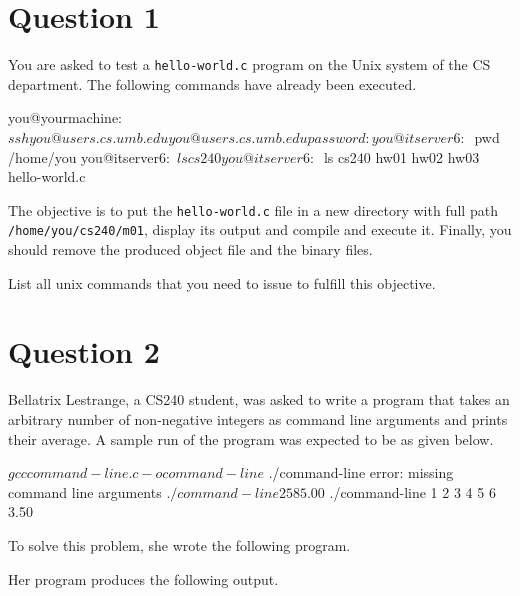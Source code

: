 \documentclass[12pt,letterpaper,twoside]{article}
\begin{document}


\section*{Question 1}

You are asked to test a \texttt{hello-world.c} program on the Unix system of the CS department.
The following commands have already been executed.

\begin{terminal}
you@yourmachine:~$ ssh you@users.cs.umb.edu
you@users.cs.umb.edu password:
you@itserver6:~$ pwd
/home/you
you@itserver6:~$ ls
cs240
you@itserver6:~$ ls cs240
hw01 hw02 hw03 hello-world.c
\end{terminal}

The objective is to put the \texttt{hello-world.c} file in a new directory with full path \texttt{/home/you/cs240/m01}, display its output and compile and execute it.
Finally, you should remove the produced object file and the binary files.

List all unix commands that you need to issue to fulfill this objective.

\newpage

\section*{Question 2}

Bellatrix Lestrange, a CS240 student, was asked to write a program that takes an arbitrary number of non-negative integers as command line arguments and prints their average.
A sample run of the program was expected to be as given below.

\begin{terminal}
$ gcc command-line.c -o command-line
$ ./command-line
error: missing command line arguments
$ ./command-line 2 5 8
5.00
$ ./command-line 1 2 3 4 5 6
3.50
\end{terminal}

To solve this problem, she wrote the following program.

\lstset{language=c,tabsize=4}


\newpage

Her program produces the following output.
\end{document}
